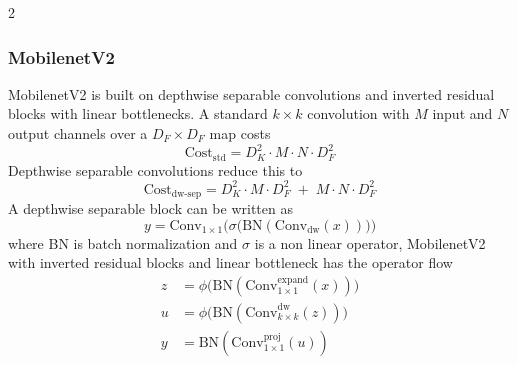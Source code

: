 \documentclass[a4paper]{article}
\begin{document}
\begin{multicols}{2}
\subsubsection{MobilenetV2}
\par \noindent
MobilenetV2 is built on depthwise separable convolutions and inverted residual blocks with linear bottlenecks. A standard $k{\times}k$ convolution with $M$ input and $N$ output channels over a $D_F{\times}D_F$ map costs
\begin{equation}
\mathrm{Cost}_{\text{std}} = D_K^2 \cdot M \cdot N \cdot D_F^2
\end{equation}
Depthwise separable convolutions reduce this to
\begin{equation}
\mathrm{Cost}_{\text{dw-sep}} = D_K^2 \cdot M \cdot D_F^2 \;+\; M \cdot N \cdot D_F^2
\end{equation}
A depthwise separable block can be written as
\begin{equation}
y = \mathrm{Conv}_{1\times1}\!\Big(\sigma\!\big(\mathrm{BN}(\mathrm{Conv}_{\text{dw}}(x))\big)\Big)
\end{equation}
where BN is batch normalization and $\sigma$ is a non linear operator,
MobilenetV2 with inverted residual blocks and linear bottleneck has the operator flow
\begin{align}
z &= \phi\!\big(\mathrm{BN}(\mathrm{Conv}^{\text{expand}}_{1\times1}(x))\big) \\
u &= \phi\!\big(\mathrm{BN}(\mathrm{Conv}^{\text{dw}}_{k\times k}(z))\big) \\
y &= \mathrm{BN}(\mathrm{Conv}^{\text{proj}}_{1\times1}(u))
\end{align}


\end{multicols}
\end{document}
